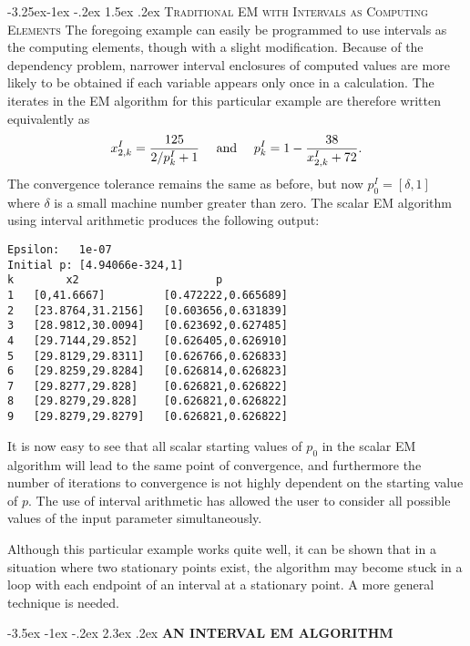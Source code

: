 \documentclass[10pt,twoside]{article}
\makeatletter
\renewcommand\section{\@startsection {section}{1}{\z@}%
                 {-3.5ex \@plus -1ex \@minus -.2ex}%
                 {2.3ex \@plus.2ex}%
                 {\normalfont\centering\bfseries }}
\renewcommand\subsection{\@startsection{subsection}{2}{\z@}%
                 {-3.25ex\@plus -1ex \@minus -.2ex}%
                 {1.5ex \@plus .2ex}%
                 {\scshape\centering\bfseries}} %
\makeatother
\begin{document}
\subsection{\textsc{Traditional EM with Intervals as Computing Elements}}
The foregoing example can easily be 
programmed to use intervals as the computing
elements, though with a
slight modification.  Because of the dependency problem, narrower interval
enclosures of computed values are more likely to
 be obtained if each variable appears only
once in a calculation.  The iterates in the EM algorithm for this particular
example are therefore written equivalently as
$$
x^I_{2,k} = \frac{125}{2 / p_k^I+1} \mbox{ \quad and \quad}
p^I_k = 1 - \frac{38}{x_{2,k}^I + 72}.
$$
The convergence tolerance remains the same as before, but now $p_0^I =
[\delta,1]$ where $\delta$ is a small machine number greater than zero.
The scalar EM algorithm
using interval arithmetic produces the following output:
\begin{verbatim}
Epsilon:   1e-07
Initial p: [4.94066e-324,1]
k        x2                     p             
1   [0,41.6667]         [0.472222,0.665689]   
2   [23.8764,31.2156]   [0.603656,0.631839]   
3   [28.9812,30.0094]   [0.623692,0.627485]   
4   [29.7144,29.852]    [0.626405,0.626910]   
5   [29.8129,29.8311]   [0.626766,0.626833]   
6   [29.8259,29.8284]   [0.626814,0.626823]   
7   [29.8277,29.828]    [0.626821,0.626822]   
8   [29.8279,29.828]    [0.626821,0.626822]   
9   [29.8279,29.8279]   [0.626821,0.626822]   
\end{verbatim}

It is now easy to see that all scalar 
starting values of $p_0$ in the scalar EM algorithm will lead to the
same point of convergence, and furthermore the number of iterations to
convergence is not highly dependent on the starting value of $p$.  The use
of
interval arithmetic has allowed the user to consider all possible values of
the input parameter simultaneously.

Although this particular example works quite well, it can be shown 
that in a situation where two stationary points exist, the algorithm may 
become stuck in a loop with each endpoint of an interval at a stationary
point.  A more general technique is needed.

\section{\bf AN INTERVAL EM ALGORITHM}\label{sec:interval_em}
\end{document}
